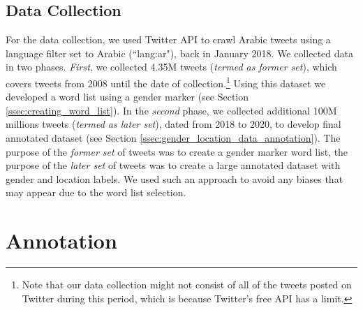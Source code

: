 \documentclass[sigconf,authorversion,nonacm]{acmart}
\begin{document}
\subsection{Data Collection}
\label{ssec:data_collection}
For the data collection, we used Twitter API to crawl Arabic tweets using a language filter set to Arabic (``lang:ar"), back in January 2018. We collected data in two phases. \textit{First}, we collected 4.35M tweets (\textit{termed as former set}), which covers tweets from 2008 until the date of collection.\footnote{Note that our data collection might not consist of all of the tweets posted on Twitter during this period, which is because Twitter's free API has a limit.} Using this dataset we developed a word list using a gender marker (see Section \ref{ssec:creating_word_list}). In the \textit{second} phase, we collected additional 100M millions tweets (\textit{termed as later set}), dated from 2018 to 2020, to develop final annotated dataset (see Section \ref{ssec:gender_location_data_annotation}). The purpose of the \textit{former set} of tweets was to create a gender marker word list, the purpose of the \textit{later set} of tweets was to create a large annotated dataset with gender and location labels. We used such an approach to avoid any biases that may appear due to the word list selection. 


 




\section{Annotation}
\label{sec:annotation}
\end{document}
